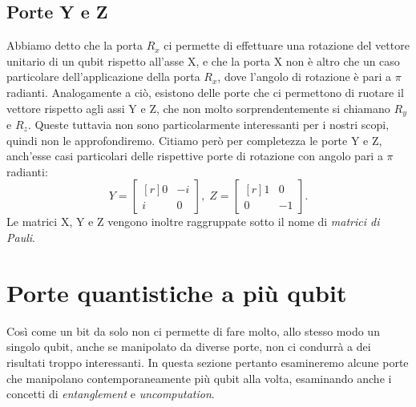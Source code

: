 \documentclass{book}
\theoremstyle{definition}
\theoremstyle{definition}
\theoremstyle{definition}
\theoremstyle{plain}
\theoremstyle{plain}
\theoremstyle{plain}
\theoremstyle{plain}
\begin{document}
\subsection{Porte Y e Z}
Abbiamo detto che la porta $R_x$ ci permette di effettuare una rotazione del vettore unitario di un qubit rispetto all'asse X, e che la porta X non è altro che un caso particolare dell'applicazione della porta $R_x$, dove l'angolo di rotazione è pari a $\pi$ radianti. Analogamente a ciò, esistono delle porte che ci permettono di ruotare il vettore rispetto agli assi Y e Z, che non molto sorprendentemente si chiamano $R_y$ e $R_z$. Queste tuttavia non sono particolarmente interessanti per i nostri scopi, quindi non le approfondiremo. Citiamo però per completezza le porte Y e Z, anch'esse casi particolari delle rispettive porte di rotazione con angolo pari a $\pi$ radianti:
\begin{displaymath}
Y = 
\begin{bmatrix*}[r]
0 & -i\\
i & 0
\end{bmatrix*} , \;
Z = 
\begin{bmatrix*}[r]
1 & 0\\
0 & -1
\end{bmatrix*} .
\end{displaymath}
Le matrici X, Y e Z vengono inoltre raggruppate sotto il nome di \emph{matrici di Pauli}.

\section{Porte quantistiche a più qubit}
Così come un bit da solo non ci permette di fare molto, allo stesso modo un singolo qubit, anche se manipolato da diverse porte, non ci condurrà a dei risultati troppo interessanti. In questa sezione pertanto esamineremo alcune porte che manipolano contemporaneamente più qubit alla volta, esaminando anche i concetti di \emph{entanglement} e \emph{uncomputation}.
\end{document}
